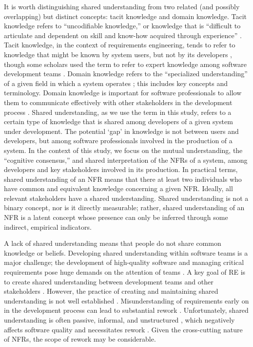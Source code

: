 \documentclass[smallextended]{svjour3}       %
\begin{document}
It is worth distinguishing shared understanding from two related (and possibly overlapping) but distinct concepts: tacit knowledge and domain knowledge. Tacit knowledge refers to ``uncodifiable knowledge,'' or knowledge that is ``difficult to articulate and dependent on skill and know-how
acquired through experience'' \citep{gacitua2009making}. 
Tacit knowledge, in the context of requirements engineering, tends to refer to knowledge that might be known by system users, but not by its developers \citep{sporsem2023refsq,niknafs2017impact}, though some scholars used the term to refer to expert knowledge among software development teams \citep{ryan2009development,ryan2013acquiring}.
Domain knowledge refers to the ``specialized understanding'' of a given field in which a system operates \citep{araujo2025domain}; this includes key concepts and terminology. Domain knowledge is important for software professionals to allow them to communicate effectively with other stakeholders in the development process \citep{ryan2013acquiring}.
Shared understanding, as we use the term in this study, refers to a certain type of knowledge that is shared among developers of a given system under development. The potential `gap' in knowledge is not between users and developers, but among software professionals involved in the production of a system. 
In the context of this study, we focus on the mutual understanding, the ``cognitive consensus,'' and shared interpretation of the NFRs of a system, among developers and key stakeholders involved in its production. 
In practical terms, shared understanding of an NFR means that there at least two individuals who have common and equivalent knowledge concerning a given NFR. Ideally, all relevant stakeholders have a shared understanding. Shared understanding is not a binary concept, nor is it directly measurable; rather, shared understanding of an NFR is a latent concept whose presence can only be inferred through some indirect, empirical indicators.



A lack of shared understanding means that people do not share common knowledge or beliefs. 
Developing shared understanding within software teams is a major challenge; the development of high-quality software and managing critical requirements pose huge demands on the attention of teams \citep{hoffmann2013emergence,corvera2013emergence}.
A key goal of RE is to create shared understanding between development teams and other stakeholders \citep{fricker2015requirements}. However,  the practice of creating and maintaining shared understanding is not well established \citep{schon_agile_2017}.
Misunderstanding of requirements early on in the development process can lead to substantial rework \citep{bjarnason2011case}.
Unfortunately, shared understanding is often passive, informal, and unstructured \citep{glinz_shared_2015}, which negatively affects software quality and necessitates rework \citep{damiantse2006}. Given the cross-cutting nature of NFRs, the scope of rework may be considerable.
\end{document}
